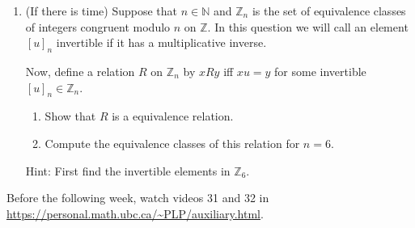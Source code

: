 \documentclass[12pt]{article}
\begin{document}
\begin{enumerate}
\item (If there is time)
Suppose that $n \in \mathbb{N}$ and $\mathbb{Z}_n$ is the set of equivalence classes of integers congruent modulo $n$ on $\mathbb{Z}$. In this question we will call an element $[u]_n$ invertible if it has a multiplicative inverse. 

Now, define a relation $R$ on $\mathbb{Z}_n$ by $xRy$ iff  $xu=y$ for some invertible $[u]_n\in \mathbb{Z}_n$.
\begin{enumerate}
    \item Show that $R$ is a equivalence relation.
    \item Compute the equivalence classes of this relation for $n=6$.
\end{enumerate}

Hint: First find the  invertible elements in $\mathbb Z_6$.



\end{enumerate}

Before the following week, watch videos 31 and 32 in \url{https://personal.math.ubc.ca/~PLP/auxiliary.html}.
\end{document}
